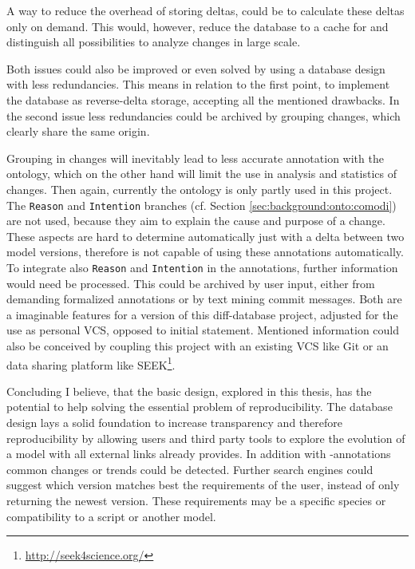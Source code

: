 A way to reduce the overhead of storing deltas, could be to calculate these deltas only on demand. This would, however, reduce the database to a cache for \bives and distinguish all possibilities to analyze changes in large scale.

Both issues could also be improved or even solved by using a database design with less redundancies. This means in relation to the first point, to implement the database as reverse-delta storage, accepting all the mentioned drawbacks.
In the second issue less redundancies could be archived by grouping changes, which clearly share the same origin.

Grouping in changes will inevitably lead to less accurate annotation with the \comodi ontology, which on the other hand will limit the use in analysis and statistics of changes. 
Then again, currently the \comodi ontology is only partly used in this project. The \texttt{Reason} and \texttt{Intention} branches (cf. Section \ref{sec:background:onto:comodi}) are not used, because they aim to explain the cause and purpose of a change. These aspects are hard to determine automatically just with a delta between two model versions, therefore is \bives not capable of using these annotations automatically.
To integrate also \texttt{Reason} and \texttt{Intention} in the annotations, further information would need be processed. This could be archived by user input, either from demanding formalized annotations or by text mining commit messages. 
Both are a imaginable features for a version of this diff-database project, adjusted for the use as personal VCS, opposed to initial statement.
Mentioned information could also be conceived by coupling this project with an existing VCS like Git or an data sharing platform like SEEK\footnote{\url{http://seek4science.org/}}.

Concluding I believe, that the basic design, explored in this thesis, has the potential to help solving the essential problem of reproducibility. The database design lays a solid foundation to increase transparency and therefore reproducibility by allowing users and third party tools to explore the evolution of a model with all external links \masymos already provides. In addition with \comodi-annotations common changes or trends could be detected.
Further search engines could suggest which version matches best the requirements of the user, instead of only returning the newest version. These requirements may be a specific species or compatibility to a \sedml script or another model.

